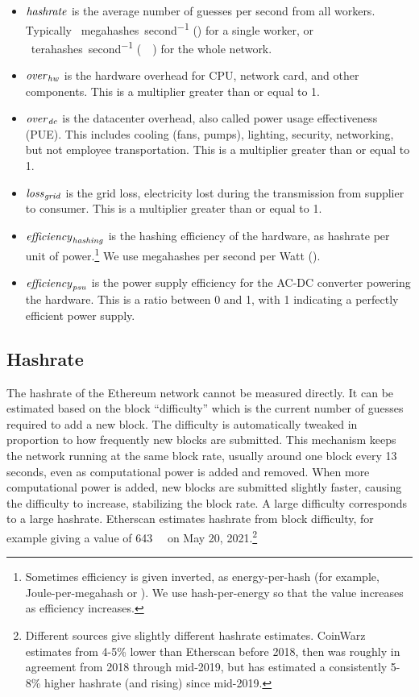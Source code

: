 \begin{itemize}
\item $\mathit{hashrate}$ is the average number of guesses per second from all workers. Typically \SI{}{megahashes\per{second}} (\hr{}) for a single worker, or \SI{}{terahashes\per{second}} (\SI{}{\tera\hps}) for the whole network.
\item $\mathit{over}_\mathit{hw}$ is the hardware overhead for CPU, network card, and other components. This is a multiplier greater than or equal to 1.
\item $\mathit{over}_\mathit{dc}$ is the datacenter overhead, also called power usage effectiveness (PUE). This includes cooling (fans, pumps), lighting, security, networking, but not employee transportation. This is a multiplier greater than or equal to 1.
\item $\mathit{loss}_\mathit{grid}$ is the grid loss, electricity lost during the transmission from supplier to consumer. This is a multiplier greater than or equal to 1.
\item $\mathit{efficiency}_\mathit{hashing}$ is the hashing efficiency of the hardware, as hashrate per unit of power.\footnote{Sometimes efficiency is given inverted, as energy-per-hash (for example, Joule-per-megahash or \effinv{}). We use hash-per-energy so that the value increases as efficiency increases.} We use megahashes per second per Watt (\eff{}).
\item $\mathit{efficiency}_\mathit{psu}$ is the power supply efficiency for the AC-DC converter powering the hardware. This is a ratio between 0 and 1, with 1 indicating a perfectly efficient power supply.
\end{itemize}

\subsection{Hashrate}

The hashrate of the Ethereum network cannot be measured directly. It can be estimated based on the block ``difficulty'' which is the current number of guesses required to add a new block. The difficulty is automatically tweaked in proportion to how frequently new blocks are submitted. This mechanism keeps the network running at the same block rate, usually around one block every 13 seconds, even as computational power is added and removed. When more computational power is added, new blocks are submitted slightly faster, causing the difficulty to increase, stabilizing the block rate. A large difficulty corresponds to a large hashrate. Etherscan\cite{etherscanio_ethereum_2021} estimates hashrate from block difficulty, for example giving a value of \SI{643}{\tera\hps} on May 20, 2021.\footnote{Different sources give slightly different hashrate estimates. CoinWarz\cite{coinwarz_ethereum_nodate} estimates from 4-5\% lower than Etherscan before 2018, then was roughly in agreement from 2018 through mid-2019, but has estimated a consistently 5-8\% higher hashrate (and rising) since mid-2019.}

